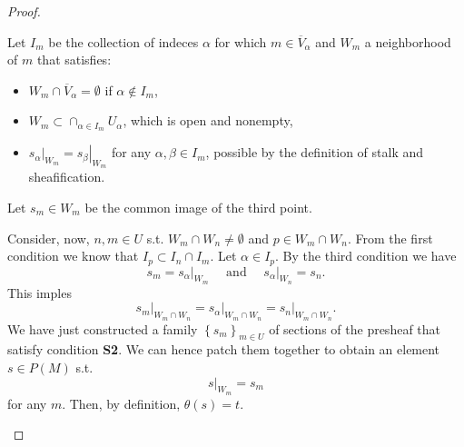 \begin{proof}
\begin{itemize}
				Let $I_m$ be the collection of indeces $\alpha$ for which $m \in \overline{V}_\alpha$ and $W_m$ a neighborhood of $m$ that satisfies:
				\begin{itemize}
					\item $W_m \cap \overline{V}_\alpha =\emptyset$ if $\alpha \notin I_m$,
					\item $W_m \subset \cap_{\alpha \in I_m} U_\alpha$, which is open and nonempty,
					\item $\left.s_\alpha\right|_{W_m} = \left.s_\beta\right|_{W_m}$ for any $\alpha, \beta \in I_m$, possible by the definition of stalk and sheafification.
				\end{itemize} 
				Let $s_m \in W_m$ be the common image of the third point.

				Consider, now, $n, m \in U$ s.t. $W_m \cap W_n \neq \emptyset$ and $p \in W_m \cap W_n$.
				From the first condition we know that $I_p \subset I_n \cap I_m$.
				Let $\alpha \in I_p$.
				By the third condition we have
				\begin{equation}
				s_m = \left.s_\alpha\right|_{W_m} \quad \text{ and } \quad \left.s_\alpha\right|_{W_n} = s_n 
				.\end{equation} 
				This imples
				\begin{equation}
				\left.s_m\right|_{W_m \cap W_n} = \left.s_\alpha\right|_{W_m\cap W_n} = \left.s_n\right|_{W_m \cap W_n}
				.\end{equation} 
				We have just constructed a family $\left\{ s_m \right\}_{m \in U}$ of sections of the presheaf that satisfy condition \textbf{S2}.
				We can hence patch them together to obtain an element $s \in P(M)$ s.t.
				\begin{equation}
					\left.s\right|_{W_m} = s_m
				\end{equation} 
				for any $m$.
				Then, by definition, $\theta(s) = t$. \qedhere
	\end{itemize} 
\end{proof}

